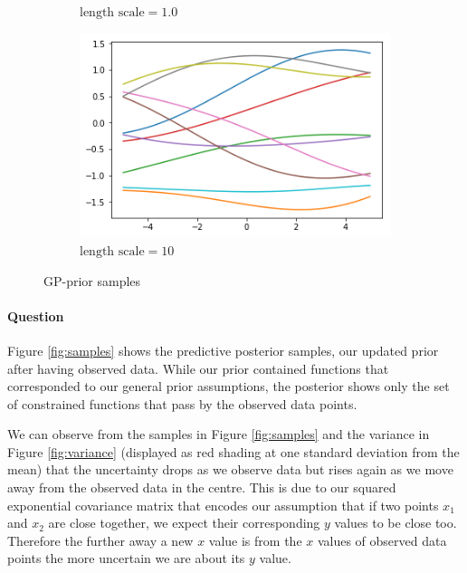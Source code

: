 \documentclass{article}
\newcounter{question}
\newcommand{\question}{\stepcounter{question}\paragraph{Question \thequestion}}
\begin{document}
\begin{figure}[H]
\begin{subfigure}[t]{0.3\linewidth}
		\caption{$\text{length scale} = 1.0$}
		\label{fig:1.0l}
	\end{subfigure}
	\begin{subfigure}[t]{0.3\linewidth}
		\includegraphics[width=\linewidth]{10}
		\caption{$\text{length scale} = 10$}
		\label{fig:10.l}
	\end{subfigure}
	\caption{GP-prior samples}
	\label{fig:GP-p}
\end{figure}
\question Figure \ref{fig:samples} shows the predictive posterior samples, our updated prior after having observed data. While our prior contained functions that corresponded to our general prior assumptions, the posterior shows only the set of constrained functions that pass by the observed data points.

We can observe from the samples in Figure \ref{fig:samples} and the variance in Figure \ref{fig:variance} (displayed as red shading at one standard deviation from the mean) that the uncertainty drops as we observe data but rises again as we move away from the observed data in the centre. This is due to our squared exponential covariance matrix that encodes our assumption that if two points $x_1$ and $x_2$ are close together, we expect their corresponding $y$ values to be close too. Therefore the further away a new $x$ value is from the $x$ values of observed data points the more uncertain we are about its $y$ value.
\end{document}
